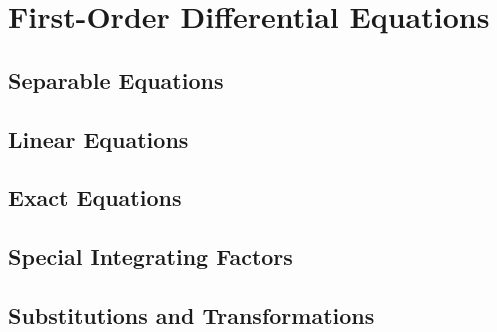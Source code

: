 \documentclass[../diffeq.tex]{subfiles}
\begin{document}
\chapter{First-Order Differential Equations}
\section{Separable Equations}
\section{Linear Equations}
\section{Exact Equations}
\section{Special Integrating Factors}
\section{Substitutions and Transformations}
\end{document}
